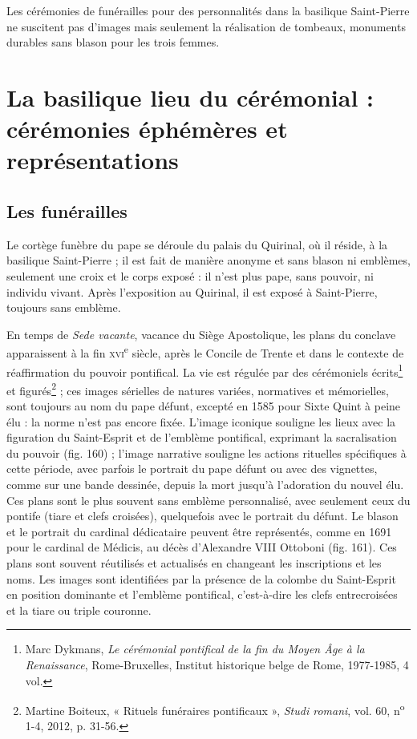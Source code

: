 \documentclass[12pt,twoside,openany]{book}
\begin{document}
Les cérémonies de funérailles pour des personnalités dans la basilique Saint-Pierre ne suscitent pas d’images mais seulement la réalisation de tombeaux, monuments durables sans blason pour les trois femmes.

\section{La basilique lieu du cérémonial : cérémonies éphémères et représentations}

\subsection{Les funérailles}

Le cortège funèbre du pape se déroule du palais du Quirinal, où il réside, à la basilique Saint-Pierre ; il est fait de manière anonyme et sans blason ni emblèmes, seulement une croix et le corps exposé : il n’est plus pape, sans pouvoir, ni individu vivant. Après l’exposition au Quirinal, il est exposé à Saint-Pierre, toujours sans emblème.

En temps de \textit{Sede vacante}, vacance du Siège Apostolique, les plans du conclave apparaissent à la fin \textsc{xvi}\textsuperscript{e }siècle, après le Concile de Trente et dans le contexte de réaffirmation du pouvoir pontifical. La vie est régulée par des cérémoniels écrits\footnote{Marc Dykmans, \textit{Le cérémonial pontifical de la fin du Moyen Âge à la Renaissance}, Rome-Bruxelles, Institut historique belge de Rome, 1977-1985, 4 vol.} et figurés\footnote{Martine Boiteux, « Rituels funéraires pontificaux », \textit{Studi romani}, vol. 60, n\textsuperscript{o} 1-4, 2012, p. 31-56.} ; ces images sérielles de natures variées, normatives et mémorielles, sont toujours au nom du pape défunt, excepté en 1585 pour Sixte Quint à peine élu : la norme n’est pas encore fixée. L’image iconique souligne les lieux avec la figuration du Saint-Esprit et de l’emblème pontifical, exprimant la sacralisation du pouvoir (fig. 160) ; l’image narrative souligne les actions rituelles spécifiques à cette période, avec parfois le portrait du pape défunt ou avec des vignettes, comme sur une bande dessinée, depuis la mort jusqu’à l’adoration du nouvel élu. Ces plans sont le plus souvent sans emblème personnalisé, avec seulement ceux du pontife (tiare et clefs croisées), quelquefois avec le portrait du défunt. Le blason et le portrait du cardinal dédicataire peuvent être représentés, comme en 1691 pour le cardinal de Médicis, au décès d’Alexandre VIII Ottoboni (fig. 161). Ces plans sont souvent réutilisés et actualisés en changeant les inscriptions et les noms. Les images sont identifiées par la présence de la colombe du Saint-Esprit en position dominante et l’emblème pontifical, c’est-à-dire les clefs entrecroisées et la tiare ou triple couronne.
\end{document}
